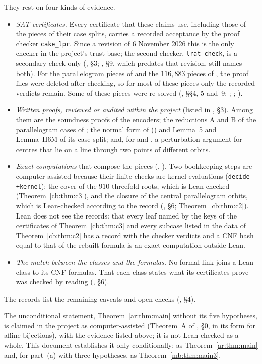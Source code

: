 \begin{remark}
\begin{itemize}
They rest on four kinds of evidence.
\begin{itemize}
\item \emph{SAT certificates.} Every certificate that these claims use, including those of the pieces of their case
splits, carries a recorded acceptance by the proof checker \texttt{cake\_lpr}. Since a revision of 6 November 2026 this is the
only checker in the project's trust base; the second checker, \texttt{lrat-check}, is a secondary check only
(, \S3; , \S9, which predates that revision, still names both). For
the parallelogram pieces of  and the $116{,}883$ pieces of , the proof files were
deleted after checking, so for most of these pieces only the recorded verdicts remain. Some of these pieces were
re-solved (, \S\S4, 5 and~9; ; ; ).
\item \emph{Written proofs, reviewed or audited within the project} (listed in , \S3).
Among them are the soundness proofs of the encoders; the reductions A and B of the parallelogram cases of
; the normal form of  () and Lemma~5 and Lemma~H6M of its
case split; and, for  and , a perturbation argument for centres that lie on a line
through two points of different orbits.
\item \emph{Exact computations} that compose the pieces (, ). Two bookkeeping steps are
computer-assisted because their finite checks are kernel evaluations (\texttt{decide +kernel}): the cover of the $910$
threefold roots, which is Lean-checked (Theorem~\ref{cb:thm:c3}), and the closure of the central parallelogram orbits,
which is Lean-checked according to the record (, \S6; Theorem~\ref{cb:thm:c2}). Lean does not
see the records: that every leaf named by the keys of the certificates of Theorem~\ref{cb:thm:c3}
and every subcase listed in the data of Theorem~\ref{cb:thm:c2} has a record with the checker verdicts and a CNF hash equal to that of the rebuilt formula is an exact computation outside
Lean.
\item \emph{The match between the classes and the formulas.} No formal link joins a Lean class to its CNF formulas.
That each class states what its certificates prove was checked by reading (, \S6).
\end{itemize}
The records list the remaining caveats and open checks (, \S4).
\end{itemize}
The unconditional statement, Theorem~\ref{ar:thm:main} without its five hypotheses, is claimed in the project as
computer-assisted (Theorem~A of , \S0, in its form for affine bijections), with the evidence
listed above; it is not Lean-checked as a whole. This document establishes it only conditionally: as
Theorem~\ref{ar:thm:main} and, for part~(a) with three hypotheses, as Theorem~\ref{mb:thm:main3}.
\end{remark}

